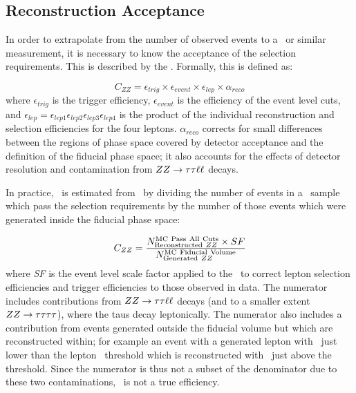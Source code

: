 \subsection{Reconstruction Acceptance \CZZ}
\label{sec:objSel-CZZ}

In order to extrapolate from the number of observed events to a \cx\ or similar
measurement, it is necessary to know the acceptance of the selection
requirements. This is described by the . Formally, this is defined as:

\begin{equation}
C_{ZZ}= \epsilon_{trig} \times \epsilon_{event} \times \epsilon_{lep} \times \alpha_{reco}
\end{equation}
where $\epsilon_{trig}$ is the trigger efficiency, $\epsilon_{event}$ is 
the efficiency of the event level cuts, and
$\epsilon_{lep} =\epsilon_{lep1}\epsilon_{lep2}\epsilon_{lep3}\epsilon_{lep4}$ is the product of the 
individual reconstruction and selection efficiencies for the four leptons. 
$\alpha_{reco}$ corrects for small differences between the
regions of phase space covered by detector acceptance and the definition of the
fiducial phase space; it also accounts for the effects of detector resolution and
contamination from $ZZ\rightarrow\tau\tau\ell\ell$ decays.

In practice, \CZZ\ is estimated from \mc\ by dividing the number of events in a
\ZZllll\ sample which pass the selection requirements by the number of those events
which were generated inside the fiducial phase space:

\begin{equation}
C_{ZZ}= \frac{ N^{\rm MC\ Pass\ All\ Cuts}_{{\rm Reconstructed}\ ZZ} \times
SF }{ N^{{\rm MC\ Fiducial\ Volume}}_{{\rm Generated}\ ZZ} }
\end{equation}
where {\it SF} is the event level scale factor applied to the \mc\ to correct
lepton selection efficiencies and trigger efficiencies to those observed in
data. The numerator includes contributions from
$ZZ\rightarrow\tau\tau\ell\ell$ decays (and to a smaller extent
$ZZ\rightarrow\tau\tau\tau\tau$), where the taus decay leptonically. The numerator also
includes a contribution from events generated outside the fiducial volume but
which are reconstructed within; for example an event with a generated lepton
with \pt\ just lower than the lepton \pt\ threshold which is reconstructed
with \pt\ just above the threshold. Since the numerator is thus not a subset of
the denominator due to these two contaminations, \CZZ\ is not a true efficiency. 

